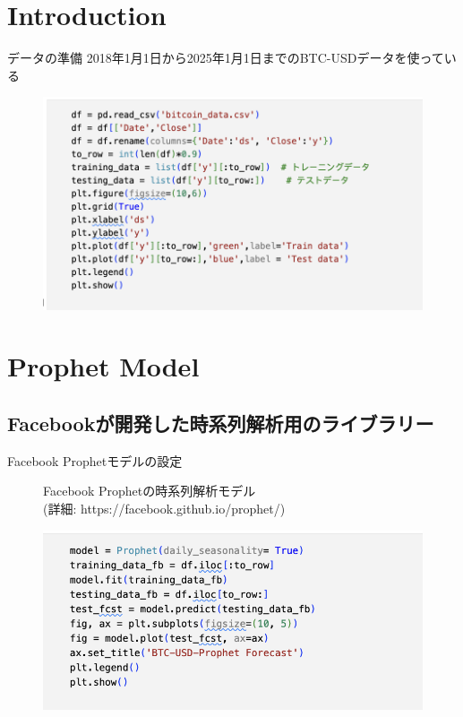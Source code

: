 \documentclass{beamer}  %
\begin{document}
\begin{frame}
    \tableofcontents[sectionstyle=show,subsectionstyle=show/shaded/hide,subsubsectionstyle=show/shaded/hide]
\end{frame}

\section{Introduction}
\begin{frame}{データの準備}
    2018年1月1日から2025年1月1日までのBTC-USDデータを使っている
    \begin{figure}[h]
        \begin{center}
            \includegraphics[keepaspectratio, scale=0.5]{pic/data_pre.png}
        \end{center}
    \end{figure}    
\end{frame}


\section{Prophet Model}
\subsection{Facebookが開発した時系列解析用のライブラリー}

\begin{frame}{Facebook Prophetモデルの設定}
    \begin{figure}[h]
        Facebook Prophetの時系列解析モデル\\
        (詳細: https://facebook.github.io/prophet/)
        \begin{center}
            \includegraphics[keepaspectratio, scale=0.6]{pic/pp_set.png}
        \end{center}
    \end{figure}  
\end{frame}
\end{document}
